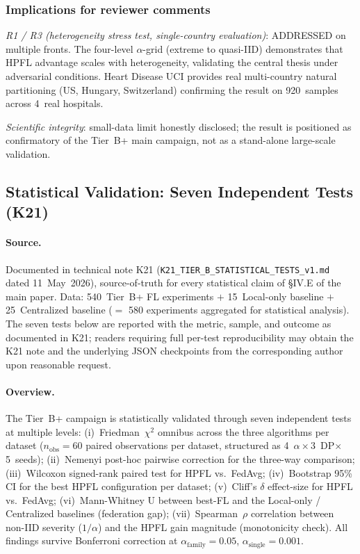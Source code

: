 \documentclass[conference]{IEEEtran}
\begin{document}
\subsubsection*{Implications for reviewer comments}

\emph{R1 / R3 (heterogeneity stress test, single-country evaluation)}: ADDRESSED on multiple fronts. The four-level $\alpha$-grid (extreme to quasi-IID) demonstrates that HPFL advantage scales with heterogeneity, validating the central thesis under adversarial conditions. Heart Disease UCI provides real multi-country natural partitioning (US, Hungary, Switzerland) confirming the result on 920~samples across 4~real hospitals.

\emph{Scientific integrity}: small-data limit honestly disclosed; the result is positioned as confirmatory of the Tier~B+ main campaign, not as a stand-alone large-scale validation.

\subsection{Statistical Validation: Seven Independent Tests (K21)}
\label{sec:tier_b_stats}

\paragraph{Source.} Documented in technical note K21 (\texttt{K21\_TIER\_B\_STATISTICAL\_TESTS\_v1.md} dated 11~May~2026), source-of-truth for every statistical claim of §IV.E of the main paper. Data: 540~Tier~B+ FL experiments $+$ 15~Local-only baseline $+$ 25~Centralized baseline ($=$ 580 experiments aggregated for statistical analysis). The seven tests below are reported with the metric, sample, and outcome as documented in K21; readers requiring full per-test reproducibility may obtain the K21 note and the underlying JSON checkpoints from the corresponding author upon reasonable request.

\paragraph{Overview.} The Tier~B+ campaign is statistically validated through seven independent tests at multiple levels: (i)~Friedman~$\chi^2$ omnibus across the three algorithms per dataset ($n_{\text{obs}}{=}60$ paired observations per dataset, structured as 4~$\alpha\times 3$~DP$\times$5~seeds); (ii)~Nemenyi post-hoc pairwise correction for the three-way comparison; (iii)~Wilcoxon signed-rank paired test for HPFL vs.\ FedAvg; (iv)~Bootstrap 95\% CI for the best HPFL configuration per dataset; (v)~Cliff's $\delta$ effect-size for HPFL vs.\ FedAvg; (vi)~Mann-Whitney U between best-FL and the Local-only / Centralized baselines (federation gap); (vii)~Spearman~$\rho$ correlation between non-IID severity ($1/\alpha$) and the HPFL gain magnitude (monotonicity check). All findings survive Bonferroni correction at $\alpha_{\text{family}}{=}0.05$, $\alpha_{\text{single}}{=}0.001$.
\end{document}
